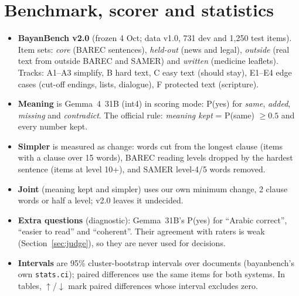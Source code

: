 \documentclass[10pt,a4paper]{article}
\begin{document}
\section{Benchmark, scorer and statistics}
\begin{itemize}
\item \textbf{BayanBench v2.0} (frozen 4 Oct; data v1.0, 731 dev and 1,250 test items). Item sets:
  \emph{core} (BAREC sentences), \emph{held-out} (news and legal), \emph{outside} (real text from outside BAREC and
  SAMER) and \emph{written} (medicine leaflets). Tracks: A1--A3 simplify, B hard text, C easy text (should stay), E1--E4
  edge cases (cut-off endings, lists, dialogue), F protected text (scripture).
\item \textbf{Meaning} is Gemma~4~31B (int4) in scoring mode: P(yes) for \emph{same}, \emph{added}, \emph{missing}
  and \emph{contradict}. The official rule: \emph{meaning kept} = P(same) $\ge 0.5$ and every number kept.
\item \textbf{Simpler} is measured as change: words cut from the longest clause (items with a clause over 15 words),
  BAREC reading levels dropped by the hardest sentence (items at level 10+), and SAMER level-4/5 words removed.
\item \textbf{Joint} (meaning kept and simpler) uses our own minimum change, 2 clause words or half a level; v2.0
  leaves it undecided.
\item \textbf{Extra questions} (diagnostic): Gemma~31B's P(yes) for ``Arabic correct'', ``easier to read'' and
  ``coherent''. Their agreement with raters is weak (Section~\ref{sec:judge}), so they are never used for decisions.
\item \textbf{Intervals} are 95\% cluster-bootstrap intervals over documents (bayanbench's own \texttt{stats.ci});
  paired differences use the same items for both systems. In tables, $\uparrow$/$\downarrow$ mark paired differences
  whose interval excludes zero.
\end{itemize}

\end{document}

